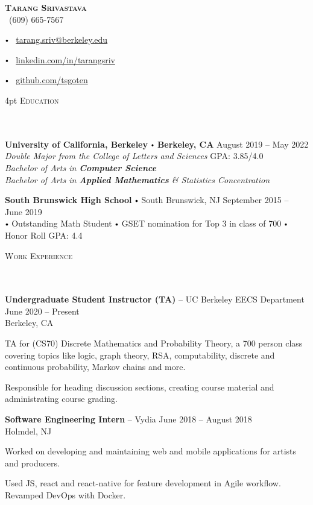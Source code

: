 \documentclass{article}
\newcommand{\contact}[3]{
\vspace*{5pt}
\begin{center}
{\LARGE \scshape {#1}}\\
\vspace{3pt}
#2 
\vspace{2pt}
#3
\end{center}
\vspace*{-8pt}
}
\newcommand{\header}[1]{{
\hspace*{-15pt}\vspace*{6pt} \textsc{#1}} \vspace*{-6pt} 
\lineunder
}
\newcommand{\lineunder}{
\vspace*{-8pt} \\ \hspace*{-18pt} 
\hrulefill \\
}
\newcommand{\school}[5]{\vspace*{2pt}%
\textbf{#1} \labelitemi #2 \hfill #3 \\ #4 \hfill #5
\vspace*{5pt}
}
\newcommand{\college}[7]{
\textbf{#1} \labelitemi \textbf{#2} \hfill #3 \\ #4 \hfill #7 \\ #5 \\ #6 \vspace*{5pt}
}
\newcommand{\employer}[4]{{
\vspace*{2pt}%
\textbf{#1} #2 \hfill #3\\ #4 \vspace*{2pt}}
}
\renewcommand{\labelitemi}{
$\vcenter{\hbox{\tiny$\bullet$}}$\hspace*{3pt}
}
\renewcommand{\labelitemii}{
$\vcenter{\hbox{\tiny$\bullet$}}$\hspace*{-3pt}
}
\newenvironment{bullet-list-minor}{
\begin{list}{\labelitemii}{\setlength\leftmargin{15pt} 
\topsep 0pt \itemsep -2pt}}{\vspace*{4pt}\end{list}
}
\begin{document}
\small
\smallskip
\vspace*{-44pt}

\contact{\textbf{Tarang Srivastava}}
{\faPhone\ (609) 665-7567 
\labelitemi \faEnvelope\ \href{mailto:tarang.sriv@berkeley.edu}{tarang.sriv@berkeley.edu}
\labelitemi \faLinkedin\ \href{https://www.linkedin.com/in/tarangsriv/}{linkedin.com/in/tarangsriv}
\labelitemi \faGithub\ \href{https://github.com/tsgoten}{github.com/tsgoten}}%

\vspace{4pt}
\header{Education}
    \college{University of California, Berkeley}{Berkeley, CA}{August 2019 -- May 2022}
    {\textit{Double Major from the College of Letters and Sciences}}
    {\textit{Bachelor of Arts in \textbf{Computer Science}}}
    {\textit{Bachelor of Arts in \textbf{Applied Mathematics} \& Statistics Concentration}}
    {GPA: 3.85/4.0}

    \school{South Brunswick High School}{South Brunswick, NJ}{September 2015 -- June 2019}
    {\labelitemi Outstanding Math Student \labelitemi GSET nomination for Top 3 in class of 700 \labelitemi Honor Roll}
    {GPA: 4.4}

\vspace*{4pt}%
\header{Work Experience}

    \employer{Undergraduate Student Instructor (TA)}
    {-- UC Berkeley EECS Department}{June 2020 -- Present}{Berkeley, CA}
	\begin{bullet-list-minor}
	\item TA for (CS70) Discrete Mathematics and Probability Theory, a 700 person class covering topics like logic, graph theory, RSA, computability, discrete and continuous probability, Markov chains and more.
	\item Responsible for heading discussion sections, creating course material and administrating course grading.  
    \end{bullet-list-minor}


    \employer{Software Engineering Intern}{-- Vydia}{June 2018 -- August 2018}{Holmdel, NJ}
	\begin{bullet-list-minor}
	\item Worked on developing and maintaining web and mobile applications for artists and producers.
	\item Used JS, react and react-native for feature development in Agile workflow. Revamped DevOps with Docker. 
    \end{bullet-list-minor}
\end{document}
